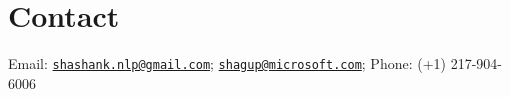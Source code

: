 
\section{\mysidestyle Contact}
Email: \href{mailto:shashank.nlp@gmail.com}{\nolinkurl{shashank.nlp@gmail.com}}; \href{mailto:shagup@microsoft.com}{\nolinkurl{shagup@microsoft.com}}; \hfill Phone: (+1) 217-904-6006 \vspace{0mm}\\\vspace{0mm}%
